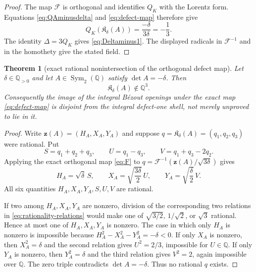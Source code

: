 \documentclass[11pt]{article}
\newtheorem{theorem}{Theorem}[section]
\theoremstyle{definition}
\theoremstyle{remark}
\newcommand{\1}{\mathbf 1}
\begin{document}
\begin{proof}
The map $\mathcal F$ is orthogonal and identifies $Q_K$ with the Lorentz form.
Equations \eqref{eq:QAminusdelta} and \eqref{eq:defect-map} therefore give
\[
 Q_K(\mathfrak K_\delta(A))
 =\frac{-\delta}{3\delta}=-\frac13.
\]
The identity $\Delta=3Q_K$ gives \eqref{eq:Deltaminus1}.  The displayed
radicals in $\mathcal F^{-1}$ and in the homothety give the stated field.
\end{proof}


\begin{theorem}[exact rational nonintersection of the orthogonal defect map]
\label{thm:defect-map-no-rational-points}
Let $\delta\in\mathbb Q_{>0}$ and let
$A\in\operatorname{Sym}_2(\mathbb Q)$ satisfy $\det A=-\delta$.  Then
\begin{equation}\label{eq:no-rational-image}
 \boxed{\mathfrak K_\delta(A)\notin\mathbb Q^3.}
\end{equation}
Consequently the image of the integral Bézout openings under the exact map
\eqref{eq:defect-map} is disjoint from the integral defect-one shell, not
merely unproved to lie in it.
\end{theorem}

\begin{proof}
Write $\mathbf z(A)=(H_A,X_A,Y_A)$ and suppose
$q=\mathfrak K_\delta(A)=(q_1,q_2,q_3)$ were rational.  Put
\begin{equation}\label{eq:SUV}
 S=q_1+q_2+q_3,
 \qquad U=q_1-q_3,
 \qquad V=q_1+q_3-2q_2.
\end{equation}
Applying the exact orthogonal map \eqref{eq:F} to
$q=\mathcal F^{-1}(\mathbf z(A)/\sqrt{3\delta})$ gives
\begin{equation}\label{eq:rationality-relations}
 H_A=\sqrt\delta\,S,
 \qquad
 X_A=\sqrt{\frac{3\delta}{2}}\,U,
 \qquad
 Y_A=\sqrt{\frac\delta2}\,V.
\end{equation}
All six quantities $H_A,X_A,Y_A,S,U,V$ are rational.

If two among $H_A,X_A,Y_A$ are nonzero, division of the corresponding two
relations in \eqref{eq:rationality-relations} would make one of
$\sqrt{3/2}$, $1/\sqrt2$, or $\sqrt3$ rational.  Hence at most one of
$H_A,X_A,Y_A$ is nonzero.  The case in which only $H_A$ is nonzero is
impossible because
$H_A^2-X_A^2-Y_A^2=-\delta<0$.  If only $X_A$ is nonzero, then
$X_A^2=\delta$ and the second relation gives $U^2=2/3$, impossible for
$U\in\mathbb Q$.  If only $Y_A$ is nonzero, then $Y_A^2=\delta$ and the
third relation gives $V^2=2$, again impossible over $\mathbb Q$.  The zero
triple contradicts $\det A=-\delta$.  Thus no rational $q$ exists.
\end{proof}
\end{document}
